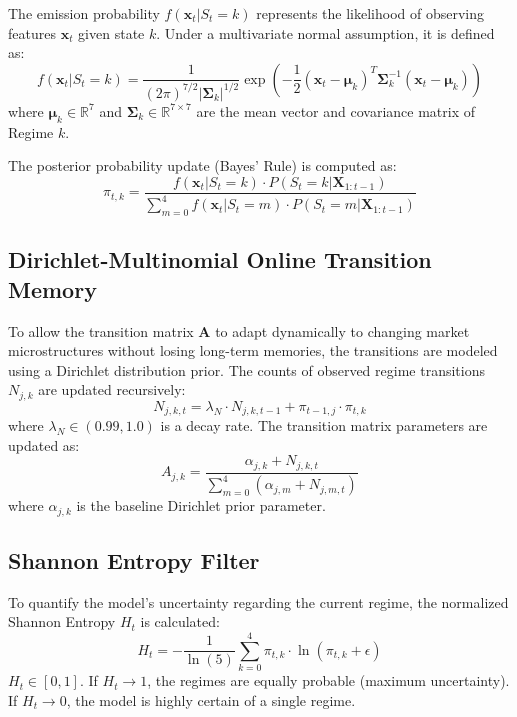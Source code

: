 \documentclass[11pt,a4paper]{article}
\begin{document}
The emission probability $f(\mathbf{x}_t | S_t = k)$ represents the likelihood of observing features $\mathbf{x}_t$ given state $k$. Under a multivariate normal assumption, it is defined as:
\begin{equation}
    f(\mathbf{x}_t | S_t = k) = \frac{1}{(2\pi)^{7/2} |\boldsymbol{\Sigma}_k|^{1/2}} \exp\left( -\frac{1}{2} (\mathbf{x}_t - \boldsymbol{\mu}_k)^T \boldsymbol{\Sigma}_k^{-1} (\mathbf{x}_t - \boldsymbol{\mu}_k) \right)
\end{equation}
where $\boldsymbol{\mu}_k \in \mathbb{R}^7$ and $\boldsymbol{\Sigma}_k \in \mathbb{R}^{7 \times 7}$ are the mean vector and covariance matrix of Regime $k$.

The posterior probability update (Bayes' Rule) is computed as:
\begin{equation}
    \pi_{t, k} = \frac{f(\mathbf{x}_t | S_t = k) \cdot P(S_t = k | \mathbf{X}_{1:t-1})}{\sum_{m=0}^4 f(\mathbf{x}_t | S_t = m) \cdot P(S_t = m | \mathbf{X}_{1:t-1})}
\end{equation}

\subsection{Dirichlet-Multinomial Online Transition Memory}

To allow the transition matrix $\mathbf{A}$ to adapt dynamically to changing market microstructures without losing long-term memories, the transitions are modeled using a Dirichlet distribution prior. The counts of observed regime transitions $N_{j, k}$ are updated recursively:
\begin{equation}
    N_{j, k, t} = \lambda_N \cdot N_{j, k, t-1} + \pi_{t-1, j} \cdot \pi_{t, k}
\end{equation}
where $\lambda_N \in (0.99, 1.0)$ is a decay rate. The transition matrix parameters are updated as:
\begin{equation}
    A_{j, k} = \frac{\alpha_{j, k} + N_{j, k, t}}{\sum_{m=0}^4 (\alpha_{j, m} + N_{j, m, t})}
\end{equation}
where $\alpha_{j, k}$ is the baseline Dirichlet prior parameter.

\subsection{Shannon Entropy Filter}

To quantify the model's uncertainty regarding the current regime, the normalized Shannon Entropy $H_t$ is calculated:
\begin{equation}
    H_t = -\frac{1}{\ln(5)} \sum_{k=0}^4 \pi_{t, k} \cdot \ln(\pi_{t, k} + \epsilon)
\end{equation}
$H_t \in [0, 1]$. If $H_t \to 1$, the regimes are equally probable (maximum uncertainty). If $H_t \to 0$, the model is highly certain of a single regime.
\end{document}
